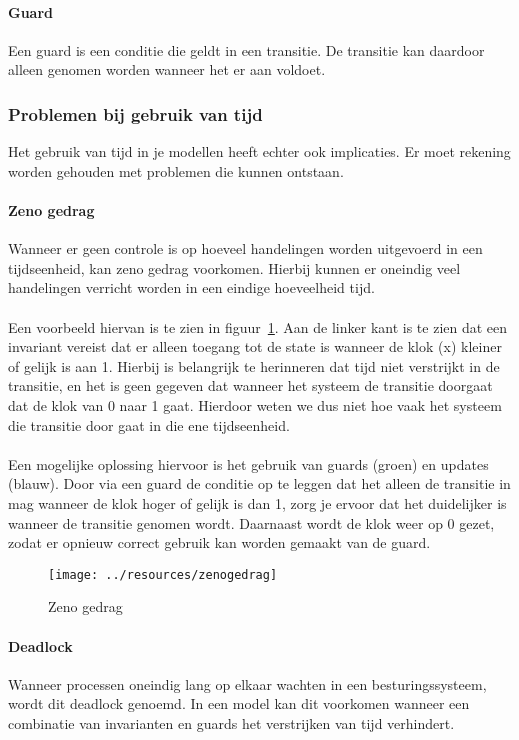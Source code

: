 \documentclass{article}
\begin{document}
      \paragraph{Guard}
        Een guard is een conditie die geldt in een transitie. De transitie kan daardoor alleen genomen worden wanneer het er aan voldoet.


    \subsubsection{Problemen bij gebruik van tijd}
      Het gebruik van tijd in je modellen heeft echter ook implicaties. Er moet rekening worden gehouden met problemen die kunnen ontstaan.

      \paragraph{Zeno gedrag}
        Wanneer er geen controle is op hoeveel handelingen worden uitgevoerd in een tijdseenheid, kan zeno gedrag voorkomen. Hierbij kunnen er oneindig veel handelingen verricht worden in een eindige hoeveelheid tijd. \\\\
        Een voorbeeld hiervan is te zien in figuur~\ref{fig:zenogedrag}. Aan de linker kant is te zien dat een invariant vereist dat er alleen toegang tot de state is wanneer de klok (x) kleiner of gelijk is aan 1. Hierbij is belangrijk te herinneren dat tijd niet verstrijkt in de transitie, en het is geen gegeven dat wanneer het systeem de transitie doorgaat dat de klok van 0 naar 1 gaat. Hierdoor weten we dus niet hoe vaak het systeem die transitie door gaat in die ene tijdseenheid. \\\\
        Een mogelijke oplossing hiervoor is het gebruik van guards (groen) en updates (blauw). Door via een guard de conditie op te leggen dat het alleen de transitie in mag wanneer de klok hoger of gelijk is dan 1, zorg je ervoor dat het duidelijker is wanneer de transitie genomen wordt. Daarnaast wordt de klok weer op 0 gezet, zodat er opnieuw correct gebruik kan worden gemaakt van de guard.

        \begin{figure}
          \centering
          \texttt{[image: ../resources/zenogedrag]}
          \caption{Zeno gedrag}
          \label{fig:zenogedrag}
        \end{figure}

      \paragraph{Deadlock}
        Wanneer processen oneindig lang op elkaar wachten in een besturingssysteem, wordt dit deadlock genoemd. In een model kan dit voorkomen wanneer een combinatie van invarianten en guards het verstrijken van tijd verhindert.
\end{document}
